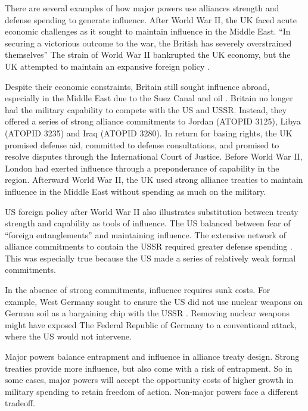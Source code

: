 \documentclass[12pt]{article}
\begin{document}
There are several examples of how major powers use alliances strength and defense spending to generate influence.
After World War II, the UK faced acute economic challenges as it sought to maintain influence in the Middle East. 
``In securing a victorious outcome to the war, the British has severely overstrained themselves'' \citep[pg. 367]{Kennedy1987}
The strain of World War II bankrupted the UK economy, but the UK attempted to maintain an expansive foreign policy \citep{Mayhew1950}. 
  

Despite their economic constraints, Britain still sought influence abroad, especially in the Middle East due to the Suez Canal and oil \citep{Rahman1982}. 
Britain no longer had the military capability to compete with the US and USSR. 
Instead, they offered a series of strong alliance commitments to Jordan (ATOPID 3125), Libya (ATOPID 3235) and Iraq (ATOPID 3280). 
In return for basing rights, the UK promised defense aid, committed to defense consultations, and promised to resolve disputes through the International Court of Justice. 
Before World War II, London had exerted influence through a preponderance of capability in the region.
Afterward World War II, the UK used strong alliance treaties to maintain influence in the Middle East without spending as much on the military. 


US foreign policy after World War II also illustrates substitution between treaty strength and capability as tools of influence. 
The US balanced between fear of ``foreign entanglements'' and maintaining influence. 
The extensive network of alliance commitments to contain the USSR required greater defense spending \citep{Fordham1998}. 
This was especially true because the US made a series of relatively weak formal commitments. 


In the absence of strong commitments, influence requires sunk costs. 
For example, West Germany sought to ensure the US did not use nuclear weapons on German soil as a bargaining chip with the USSR \citep[pg. 599--600]{Kissinger1994}. 
Removing nuclear weapons might have exposed The Federal Republic of Germany to a conventional attack, where the US would not intervene.  


Major powers balance entrapment and influence in alliance treaty design. 
Strong treaties provide more influence, but also come with a risk of entrapment. 
So in some cases, major powers will accept the opportunity costs of higher growth in military spending to retain freedom of action. 
Non-major powers face a different tradeoff. 
\end{document}
